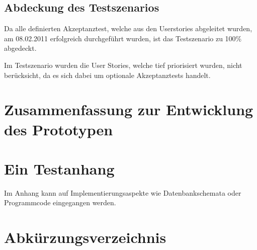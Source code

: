 \documentclass[abstracton, listof=totocnumbered,
bibliography=totocnumbered]{scrreprt}
\begin{document}
  \clearpage
  
  \section{Abdeckung des Testszenarios}
  
  Da alle definierten Akzeptanztest, welche aus den Userstories abgeleitet
  wurden, am 08.02.2011 erfolgreich durchgeführt wurden, ist das Testszenario zu
  100\% abgedeckt.
  
  Im Testszenario wurden die User Stories, welche tief priorisiert wurden, nicht
  berücksicht, da es sich dabei um optionale Akzeptanztests handelt.
  
  \newpage
  
  \chapter{Zusammenfassung zur Entwicklung des Prototypen}
  
  
  
  
  \appendix
  
  \chapter{Ein Testanhang}
  
  Im Anhang kann auf Implementierungsaspekte wie Datenbankschemata
  oder Programmcode eingegangen werden.
  
  
  \chapter{Abkürzungsverzeichnis}
  \begin{acronym}
    \setlength{\itemsep}{-\parsep}
  \end{acronym}
  
\end{document}
